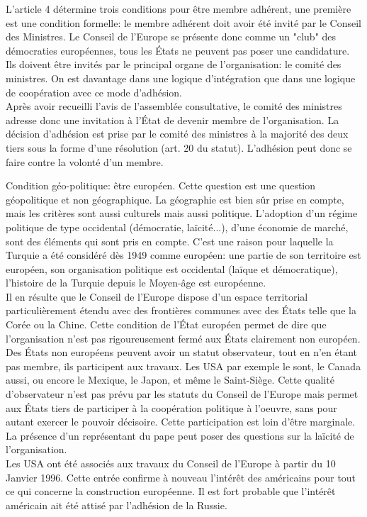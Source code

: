 \documentclass[10pt, a4paper, openany]{book}
\begin{document}
L'article 4 détermine trois conditions pour être membre adhérent, une première est une condition formelle: le membre adhérent doit avoir été invité par le Conseil des Ministres. Le Conseil de l'Europe se présente donc comme un "club" des démocraties européennes, tous les États ne peuvent pas poser une candidature. Ils doivent être invités par le principal organe de l'organisation: le comité des ministres. On est davantage dans une logique d'intégration que dans une logique de coopération avec ce mode d'adhésion. \\
Après avoir recueilli l'avis de l'assemblée consultative, le comité des ministres adresse donc une invitation à l'État de devenir membre de l'organisation. La décision d'adhésion est prise par le comité des ministres à la majorité des deux tiers sous la forme d'une résolution (art. 20 du statut). L'adhésion peut donc se faire contre la volonté d'un membre.


Condition géo-politique: être européen. Cette question est une question géopolitique et non géographique. La géographie est bien sûr prise en compte, mais les critères sont aussi culturels mais aussi politique. L'adoption d'un régime politique de type occidental (démocratie, laïcité...), d'une économie de marché, sont des éléments qui sont pris en compte. C'est une raison pour laquelle la Turquie a été considéré dès 1949 comme européen: une partie de son territoire est européen, son organisation politique est occidental (laïque et démocratique), l'histoire de la Turquie depuis le Moyen-âge est européenne. \\
Il en résulte que le Conseil de l'Europe dispose d'un espace territorial particulièrement étendu avec des frontières communes avec des États telle que la Corée ou la Chine. Cette condition de l'État européen permet de dire que l'organisation n'est pas rigoureusement fermé aux États clairement non européen. \\
Des États non européens peuvent avoir un statut observateur, tout en n'en étant pas membre, ils participent aux travaux. Les USA par exemple le sont, le Canada aussi, ou encore le Mexique, le Japon, et même le Saint-Siège. Cette qualité d'observateur n'est pas prévu par les statuts du Conseil de l'Europe mais permet aux États tiers de participer à la coopération politique à l'oeuvre, sans pour autant exercer le pouvoir décisoire. Cette participation est loin d'être marginale. \\
La présence d'un représentant du pape peut poser des questions sur la laïcité de l'organisation. \\
Les USA ont été associés aux travaux du Conseil de l'Europe à partir du 10 Janvier 1996. Cette entrée confirme à nouveau l'intérêt des américains pour tout ce qui concerne la construction européenne. Il est fort probable que l'intérêt américain ait été attisé par l'adhésion de la Russie. 
\end{document}
